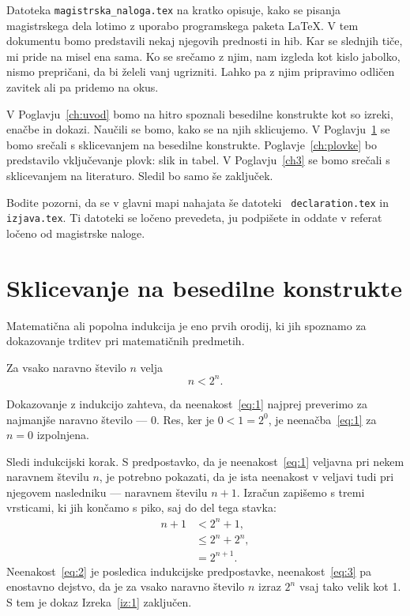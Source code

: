 \documentclass[a4paper, 12pt]{book}
\begin{document}
Datoteka {\tt magistrska\_naloga.tex} na kratko opisuje, kako se pisanja magistrskega dela lotimo z uporabo programskega paketa \LaTeX. V tem dokumentu bomo predstavili nekaj njegovih prednosti in hib. Kar se slednjih tiče, mi pride na misel ena sama. Ko se srečamo z njim, nam izgleda kot kislo jabolko, nismo prepričani, da bi želeli vanj ugrizniti. Lahko pa z njim pripravimo odličen zavitek ali pa pridemo na okus.

V Poglavju~\ref{ch:uvod} bomo na hitro spoznali besedilne konstrukte kot so izreki, enačbe in dokazi. Naučili se bomo, kako se na njih sklicujemo. V Poglavju~\ref{ch:sklicevanje} se bomo srečali s sklicevanjem na besedilne konstrukte. Poglavje~\ref{ch:plovke} bo predstavilo vključevanje plovk: slik in tabel. V Poglavju~\ref{ch3} se bomo srečali s sklicevanjem na literaturo.
Sledil bo samo še zaključek.

Bodite pozorni, da se v glavni mapi nahajata še datoteki \verb+ declaration.tex+ in \verb+ izjava.tex+. Ti datoteki se ločeno prevedeta, ju podpišete in oddate v referat ločeno od magistrske naloge.

\chapter{Sklicevanje na besedilne konstrukte}
\label{ch:sklicevanje}

Matematična ali popolna indukcija je eno prvih orodij, ki jih spoznamo za dokazovanje trditev pri matematičnih predmetih.
\begin{izrek}
\label{iz:1}
Za vsako naravno število $n$ velja
\begin{equation}
n < 2^n.
\label{eq:1}
\end{equation}
\end{izrek}
\begin{dokaz}
Dokazovanje z indukcijo zahteva, da neenakost~\eqref{eq:1} najprej preverimo za najmanjše naravno število --- $0$. Res, ker je $0 < 1 = 2^0$, je neenačba~\eqref{eq:1} za $n=0$ izpolnjena.

Sledi indukcijski korak. S predpostavko, da je neenakost~\eqref{eq:1} veljavna pri nekem naravnem številu $n$, je potrebno pokazati, da je ista neenakost v veljavi tudi pri njegovem nasledniku --- naravnem številu $n+1$. Izračun zapišemo s tremi vrsticami, ki jih končamo s piko, saj do del tega stavka:
\begin{align}
n+1 &< 2^n + 1,  \label{eq:2}\\
    &\le 2^n + 2^n, \label{eq:3}\\
    &= 2^{n+1}. \nonumber
\end{align}
Neenakost~\eqref{eq:2} je posledica indukcijske predpostavke, neenakost~\eqref{eq:3} pa enostavno dejstvo, da je za vsako naravno število $n$ izraz $2^n$ vsaj tako velik kot 1. S tem je dokaz Izreka~\ref{iz:1} zaključen.
\end{dokaz}
\end{document}
